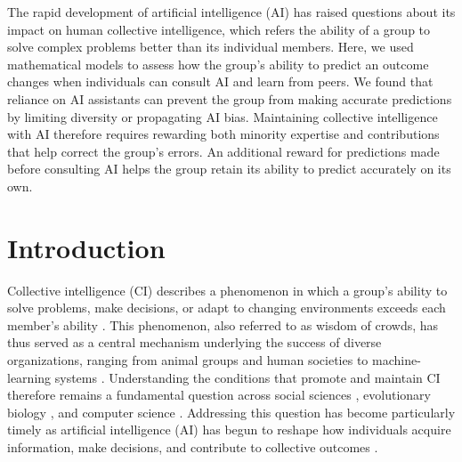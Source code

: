 \documentclass[12pt]{article}
\begin{document}
The rapid development of artificial intelligence (AI) has raised questions about its impact on human collective intelligence, which refers the ability of a group to solve complex problems better than its individual members.
Here, we used mathematical models to assess how the group's ability to predict an outcome changes when individuals can consult AI and learn from peers.
We found that reliance on AI assistants can prevent the group from making accurate predictions by limiting diversity or propagating AI bias.
Maintaining collective intelligence with AI therefore requires rewarding both minority expertise and contributions that help correct the group’s errors.
An additional reward for predictions made before consulting AI helps the group retain its ability to predict accurately on its own.

\pagebreak

\section*{Introduction}
\noindent
Collective intelligence (CI) describes a phenomenon in which a group's ability to solve problems, make decisions, or adapt to changing environments exceeds each member's ability \citep{galton1907vox,lorge1958survey,yaniv2007using,woolley2010evidence,hommes2005coordination}.
This phenomenon, also referred to as wisdom of crowds, has thus served as a central mechanism underlying the success of diverse organizations, ranging from animal groups \citep{dreyer2025comparing,simons2004many,berdahl2013emergent} and human societies \citep{woolley2010evidence, riedl2021quantifying} to machine-learning systems \citep{breiman1996bagging,breiman2001random}.
Understanding the conditions that promote and maintain CI therefore remains a fundamental question across social sciences \citep{mann2017optimal}, evolutionary biology \citep{wang2025individual}, and computer science \citep{werfel2026fluid}.
Addressing this question has become particularly timely as artificial intelligence (AI) has begun to reshape how individuals acquire information, make decisions, and contribute to collective outcomes \citep{cui2024ai}.
\end{document}
